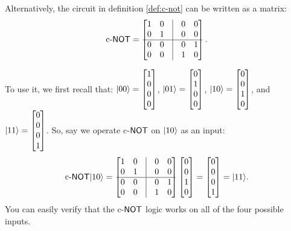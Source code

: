 \documentclass[12pt]{article}
\begin{document}
\begin{notation}
Alternatively, the circuit in definition \ref{def:c-not} can be written as a matrix: $$
\text{c-}\NOT = \begin{bmatrix}
1 & 0 & \vline & 0 & 0 \\
0 & 1 & \vline & 0 & 0 \\
\hline
0 & 0 & \vline & 0 & 1 \\
0 & 0 & \vline & 1 & 0 \\
\end{bmatrix}.
$$

\noindent To use it, we first recall that: $\Ket{00} = \begin{bmatrix}
    1\\
    0\\
    0\\
    0
\end{bmatrix}$, $\Ket{01} = \begin{bmatrix}
    0\\
    1\\
    0\\
    0
\end{bmatrix}$, $\Ket{10} = \begin{bmatrix}
    0\\
    0\\
    1\\
    0
\end{bmatrix}$, and $\Ket{11} = \begin{bmatrix}
    0\\
    0\\
    0\\
    1
\end{bmatrix}$. So, say we operate c-$\NOT$ on $\Ket{10}$ as an input: $$
\text{c-}\NOT \Ket{10} = \begin{bmatrix}
1 & 0 & \vline & 0 & 0 \\
0 & 1 & \vline & 0 & 0 \\
\hline
0 & 0 & \vline & 0 & 1 \\
0 & 0 & \vline & 1 & 0 \\
\end{bmatrix}\begin{bmatrix}
    0\\
    0\\
    1\\
    0
\end{bmatrix} = \begin{bmatrix}
    0\\
    0\\
    0\\
    1
\end{bmatrix} = \Ket{11}.
$$ You can easily verify that the c-$\NOT$ logic works on all of the four possible inputs.
\end{notation}
\end{document}
